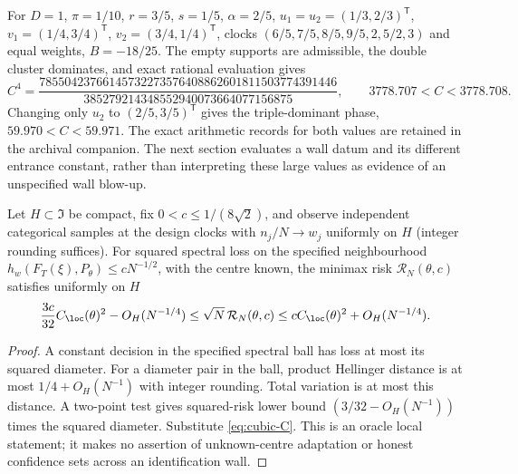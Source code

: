 \begin{example}
For $D=1$, $\pi=1/10$, $r=3/5$, $s=1/5$, $\alpha=2/5$,
$u_1=u_2=(1/3,2/3)^{\mathsf T}$,
$v_1=(1/4,3/4)^{\mathsf T}$, $v_2=(3/4,1/4)^{\mathsf T}$,
clocks $(6/5,7/5,8/5,9/5,2,5/2,3)$ and equal weights,
$B=-18/25$. The empty supports are admissible, the double cluster
dominates, and exact rational evaluation gives
\[
 C^4=\frac{78550423766145732273576408862601811503774391446}
            {385279214348552940073664077156875},\qquad
 3778.707<C<3778.708.
\]
Changing only $u_2$ to $(2/5,3/5)^{\mathsf T}$ gives the triple-dominant
phase, $59.970<C<59.971$. The exact arithmetic records for both values
are retained in the archival companion. The next section evaluates a
wall datum and its different entrance constant, rather than interpreting
these large values as evidence of an unspecified wall blow-up.
\end{example}

\begin{corollary}\label{cor:risk}
Let $H\subset\mathfrak I$ be compact, fix $0<c\le1/(8\sqrt2)$, and
observe independent categorical samples at the design clocks with
$n_j/N\to w_j$ uniformly on $H$ (integer rounding suffices).
For squared spectral loss on the specified neighbourhood
$h_w(F_T(\xi),P_\theta)\le cN^{-1/2}$, with the centre known, the
minimax risk $\mathcal R_N(\theta,c)$ satisfies uniformly on $H$
\[
 \frac{3c}{32}C_{\loc}(\theta)^2-O_H(N^{-1/4})
 \le\sqrt N\,\mathcal R_N(\theta,c)
 \le cC_{\loc}(\theta)^2+O_H(N^{-1/4}).
\]
\end{corollary}
\begin{proof}
A constant decision in the specified spectral ball has loss at most its
squared diameter. For a diameter pair in the ball, product Hellinger
distance is at most $1/4+O_H(N^{-1})$ with integer rounding. Total variation
is at most this distance. A two-point test gives squared-risk lower bound
$(3/32-O_H(N^{-1}))$ times the squared diameter. Substitute \eqref{eq:cubic-C}. This is an oracle local
statement; it makes no assertion of unknown-centre adaptation or honest
confidence sets across an identification wall.
\end{proof}
